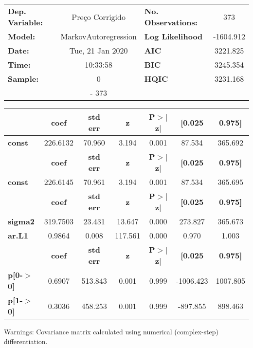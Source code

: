 \begin{center}
\begin{tabular}{lclc}
\toprule
\textbf{Dep. Variable:} &   Preço Corrigido    & \textbf{  No. Observations:  } &    373      \\
\textbf{Model:}         & MarkovAutoregression & \textbf{  Log Likelihood     } & -1604.912   \\
\textbf{Date:}          &   Tue, 21 Jan 2020   & \textbf{  AIC                } &  3221.825   \\
\textbf{Time:}          &       10:33:58       & \textbf{  BIC                } &  3245.354   \\
\textbf{Sample:}        &          0           & \textbf{  HQIC               } &  3231.168   \\
\textbf{}               &         - 373        & \textbf{                     } &             \\
\bottomrule
\end{tabular}
\begin{tabular}{lcccccc}
               & \textbf{coef} & \textbf{std err} & \textbf{z} & \textbf{P$>$$|$z$|$} & \textbf{[0.025} & \textbf{0.975]}  \\
\midrule
\textbf{const} &     226.6132  &       70.960     &     3.194  &         0.001        &       87.534    &      365.692     \\
               & \textbf{coef} & \textbf{std err} & \textbf{z} & \textbf{P$>$$|$z$|$} & \textbf{[0.025} & \textbf{0.975]}  \\
\midrule
\textbf{const} &     226.6145  &       70.961     &     3.194  &         0.001        &       87.534    &      365.695     \\
                & \textbf{coef} & \textbf{std err} & \textbf{z} & \textbf{P$>$$|$z$|$} & \textbf{[0.025} & \textbf{0.975]}  \\
\midrule
\textbf{sigma2} &     319.7503  &       23.431     &    13.647  &         0.000        &      273.827    &      365.673     \\
\textbf{ar.L1}  &       0.9864  &        0.008     &   117.561  &         0.000        &        0.970    &        1.003     \\
                   & \textbf{coef} & \textbf{std err} & \textbf{z} & \textbf{P$>$$|$z$|$} & \textbf{[0.025} & \textbf{0.975]}  \\
\midrule
\textbf{p[0-$>$0]} &       0.6907  &      513.843     &     0.001  &         0.999        &    -1006.423    &     1007.805     \\
\textbf{p[1-$>$0]} &       0.3036  &      458.253     &     0.001  &         0.999        &     -897.855    &      898.463     \\
\bottomrule
\end{tabular}
\end{center}

Warnings: \newline
 [1] Covariance matrix calculated using numerical (complex-step) differentiation.